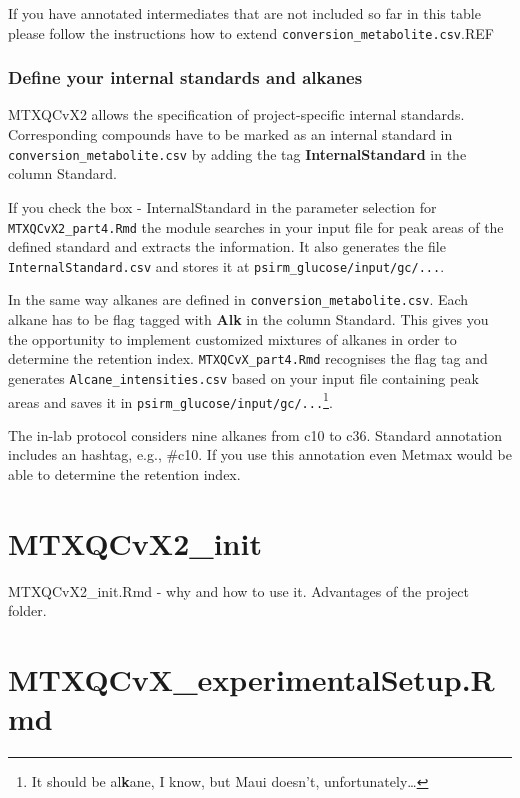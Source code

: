 \documentclass[]{book}
\let\rmarkdownfootnote\footnote%
\def\footnote{\protect\rmarkdownfootnote}
\theoremstyle{definition}
\theoremstyle{definition}
\theoremstyle{definition}
\theoremstyle{remark}
\begin{document}
If you have annotated intermediates that are not included so far in this
table please follow the instructions how to extend
\texttt{conversion\_metabolite.csv}.REF

\subsection{Define your internal standards and
alkanes}\label{define-your-internal-standards-and-alkanes}

MTXQCvX2 allows the specification of project-specific internal
standards. Corresponding compounds have to be marked as an internal
standard in \texttt{conversion\_metabolite.csv} by adding the tag
\textbf{InternalStandard} in the column Standard.

If you check the box - InternalStandard in the parameter selection for
\texttt{MTXQCvX2\_part4.Rmd} the module searches in your input file for
peak areas of the defined standard and extracts the information. It also
generates the file \texttt{InternalStandard.csv} and stores it at
\texttt{psirm\_glucose/input/gc/...}.

In the same way alkanes are defined in
\texttt{conversion\_metabolite.csv}. Each alkane has to be flag tagged
with \textbf{Alk} in the column Standard. This gives you the opportunity
to implement customized mixtures of alkanes in order to determine the
retention index. \texttt{MTXQCvX\_part4.Rmd} recognises the flag tag and
generates \texttt{Alcane\_intensities.csv} based on your input file
containing peak areas and saves it in
\texttt{psirm\_glucose/input/gc/...}\footnote{It should be
  al\textbf{k}ane, I know, but Maui doesn't, unfortunately\ldots{}}.

The in-lab protocol considers nine alkanes from c10 to c36. Standard
annotation includes an hashtag, e.g., \#c10. If you use this annotation
even Metmax would be able to determine the retention index.

\chapter{MTXQCvX2\_init}\label{init}

MTXQCvX2\_init.Rmd - why and how to use it. Advantages of the project
folder.

\chapter{MTXQCvX\_experimentalSetup.Rmd}\label{ExpSetup}
\end{document}
